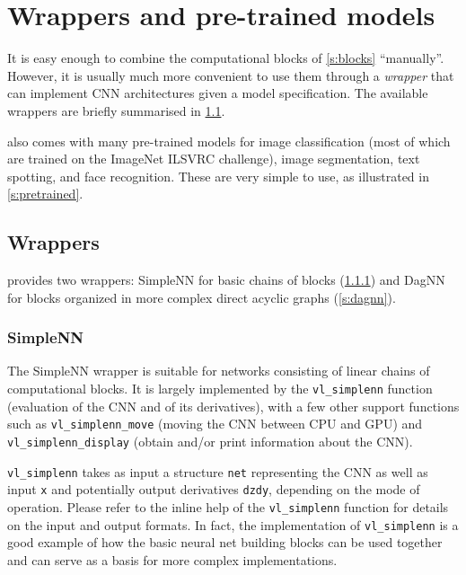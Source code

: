 \chapter{Wrappers and pre-trained models}\label{s:wrappers}

It is easy enough to combine the computational blocks of \cref{s:blocks} ``manually''. However, it is usually much more convenient to use them through a \emph{wrapper} that can implement CNN architectures given a model specification. The available wrappers are briefly summarised in \cref{s:wrappers-overview}.

\matconvnet also comes with many pre-trained models for image classification (most of which are trained on the ImageNet ILSVRC challenge), image segmentation, text spotting, and face recognition. These are very simple to use, as illustrated in \cref{s:pretrained}.

\section{Wrappers}\label{s:wrappers-overview}

\matconvnet provides two wrappers: SimpleNN for basic chains of blocks (\cref{s:simplenn}) and DagNN for blocks organized in more complex direct acyclic graphs (\cref{s:dagnn}).

\subsection{SimpleNN}\label{s:simplenn}

The SimpleNN wrapper is suitable for networks consisting of linear chains of computational blocks.  It is largely implemented by the \verb!vl_simplenn! function (evaluation of the CNN and of its derivatives), with a few other support functions such as \verb!vl_simplenn_move! (moving the CNN between CPU and GPU) and \verb!vl_simplenn_display! (obtain and/or print information about the CNN).

\verb!vl_simplenn! takes as input a structure \verb!net! representing the CNN as well as input \verb!x! and potentially output derivatives \verb!dzdy!, depending on the mode of operation. Please refer to the inline help of the \verb!vl_simplenn! function for details on the input and output formats. In fact, the implementation of \verb!vl_simplenn! is a good example of how the basic neural net building blocks can be used together and can serve as a basis for more complex implementations.

